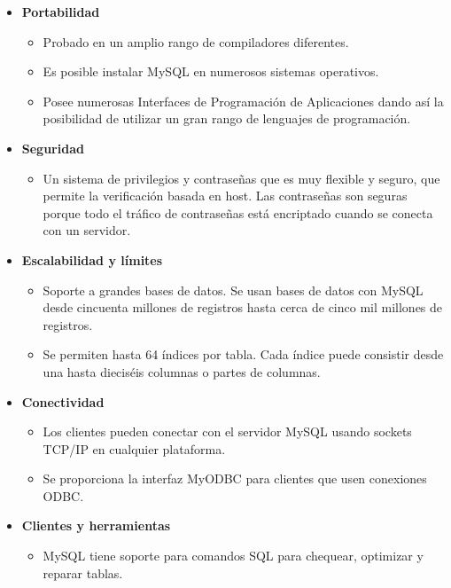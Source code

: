     \begin{itemize}
      \item {\bf Portabilidad}
        \begin{itemize}
          \item Probado en un amplio rango de compiladores diferentes.
          \item Es posible instalar MySQL en numerosos sistemas operativos.
          \item Posee numerosas Interfaces de Programación de Aplicaciones dando así la posibilidad de utilizar un gran rango de lenguajes de programación.
        \end{itemize}
      
      \item {\bf Seguridad}
        \begin{itemize}
          \item Un sistema de privilegios y contraseñas que es muy flexible y seguro, que permite la verificación basada en host. Las contraseñas son seguras porque todo el tráfico de contraseñas está encriptado cuando se conecta con un servidor.
        \end{itemize}
    
      \item {\bf Escalabilidad y límites}
        \begin{itemize}
          \item Soporte a grandes bases de datos. Se usan bases de datos con MySQL desde cincuenta millones de registros hasta cerca de cinco mil millones de registros.
          \item Se permiten hasta 64 índices por tabla. Cada índice puede consistir desde una hasta dieciséis columnas o partes de columnas.
        \end{itemize}
        
      \item {\bf Conectividad}
        \begin{itemize}
          \item Los clientes pueden conectar con el servidor MySQL usando sockets TCP/IP en cualquier plataforma.
          \item Se proporciona la interfaz MyODBC para clientes que usen conexiones ODBC.
        \end{itemize}
        
      \item {\bf Clientes y herramientas}
        \begin{itemize}
          \item MySQL tiene soporte para comandos SQL para chequear, optimizar y reparar tablas.
        \end{itemize}
        
    \end{itemize}
      
